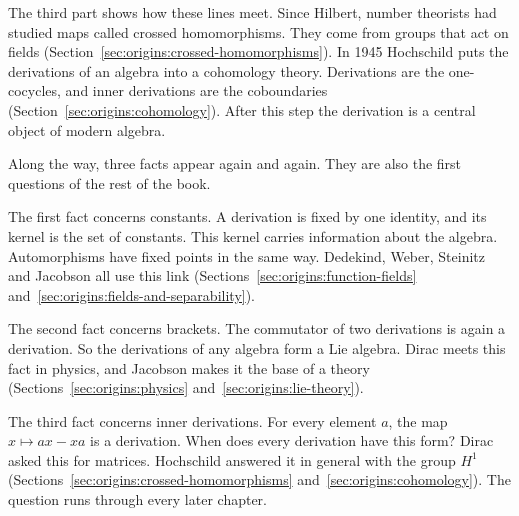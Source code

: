 The third part shows how these lines meet. Since Hilbert, number theorists
had studied maps called crossed homomorphisms. They come from groups that act
on fields (Section~\ref{sec:origins:crossed-homomorphisms}). In 1945
Hochschild puts the derivations of an algebra into a cohomology theory.
Derivations are the one-cocycles, and inner derivations are the coboundaries
(Section~\ref{sec:origins:cohomology}). After this step the derivation is a
central object of modern algebra.

Along the way, three facts appear again and again. They are also the first
questions of the rest of the book.

The first fact concerns constants. A derivation is fixed by one identity, and
its kernel is the set of constants. This kernel carries information about the
algebra. Automorphisms have fixed points in the same way. Dedekind, Weber,
Steinitz and Jacobson all use this link
(Sections~\ref{sec:origins:function-fields}
and~\ref{sec:origins:fields-and-separability}).

The second fact concerns brackets. The commutator of two derivations is again
a derivation. So the derivations of any algebra form a Lie algebra. Dirac
meets this fact in physics, and Jacobson makes it the base of a theory
(Sections~\ref{sec:origins:physics} and~\ref{sec:origins:lie-theory}).

The third fact concerns inner derivations. For every element $a$, the map
$x \mapsto ax - xa$ is a derivation. When does every derivation have this
form? Dirac asked this for matrices. Hochschild answered it in general with
the group $H^1$ (Sections~\ref{sec:origins:crossed-homomorphisms}
and~\ref{sec:origins:cohomology}). The question runs through every later
chapter.
